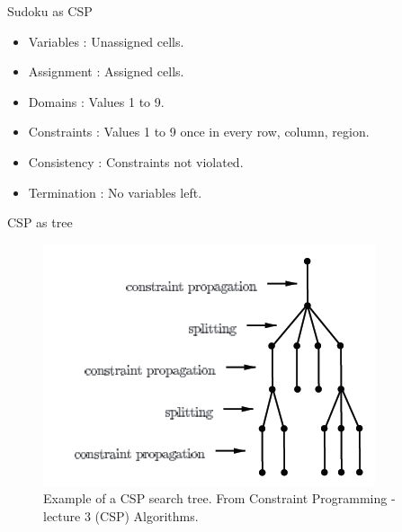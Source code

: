 \documentclass{beamer}
\begin{document}
\begin{frame}{Sudoku as CSP}

  \begin{itemize}
  \item
    Variables   : Unassigned cells.
  \item
    Assignment  : Assigned cells.
  \item
    Domains     : Values 1 to 9.
  \item
    Constraints : Values 1 to 9 once in every row, column, region.
  \item
    Consistency : Constraints not violated.
  \item
    Termination : No variables left.
  \end{itemize}
\end{frame}

\begin{frame}{CSP as tree}

  \begin{figure}[htbp]
\begin{center}
\includegraphics{tree.png}
\caption{Example of a CSP search tree. From Constraint Programming - lecture 3 (CSP) Algorithms. }
\label{fig:basic_tree}
\end{center}
\end{figure}

\end{frame}
\end{document}
